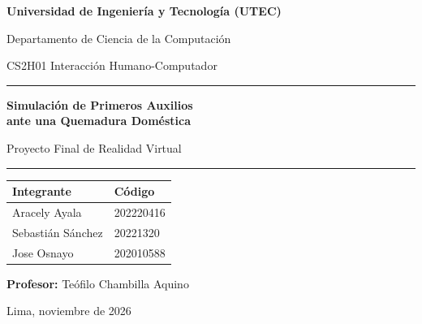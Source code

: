 \documentclass[11pt,a4paper]{article}
\begin{document}
\begin{titlepage}
\centering
{\large\bfseries Universidad de Ingeniería y Tecnología (UTEC)\par}
{\normalsize Departamento de Ciencia de la Computación\par}
\vspace{0.4em}
{\normalsize CS2H01 Interacción Humano-Computador\par}
\vspace{4.5em}
{\color{Azul}\rule{0.6\linewidth}{1.2pt}\par}
\vspace{1.2em}
{\Huge\bfseries Simulación de Primeros Auxilios\\[0.25em] ante una Quemadura Doméstica\par}
\vspace{0.8em}
{\Large Proyecto Final de Realidad Virtual\par}
\vspace{1.2em}
{\color{Azul}\rule{0.6\linewidth}{1.2pt}\par}
\vspace{4em}
\begin{tabular}{l l}
\toprule
\textbf{Integrante} & \textbf{Código} \\
\midrule
Aracely Ayala & 202220416 \\
Sebastián Sánchez & 20221320 \\
Jose Osnayo & 202010588 \\
\bottomrule
\end{tabular}
\par\vspace{3em}
{\normalsize\textbf{Profesor:} Teófilo Chambilla Aquino\par}
\vfill
{\normalsize Lima, noviembre de 2026\par}
\end{titlepage}

\begin{abstract}
Presentamos una experiencia de realidad virtual para Meta Quest en la que el usuario atiende a su tía, que acaba de quemarse la mano con una olla de agua hirviendo. Con sus propias manos o con los controles, debe apagar la hornilla, retirar el anillo, enfriar la quemadura 20 minutos bajo el caño, llamar al 106 y cubrirla con film o una bolsa limpia, mientras la piel y la víctima reaccionan a cada acción. En una prueba con 6 usuarios en el visor, en su primera partida completaron el 98\,\% de los pasos del protocolo y su confianza para atender una quemadura subió de 2,6 a 4,0 sobre 5. El rendimiento quedó por debajo de los 72~fps exigidos (51 de promedio).
\end{abstract}
\end{document}
